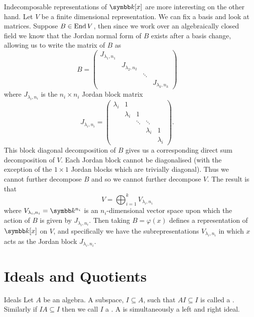 \begin{exm}{}{}
    Indecomposable representations of \(\field[x]\) are more interesting on the other hand.
    Let \(V\) be a finite dimensional representation.
    We can fix a basis and look at matrices.
    Suppose \(B \in \operatorname{End} V\), then since we work over an algebraically closed field we know that the Jordan normal form of \(B\) exists after a basis change, allowing us to write the matrix of \(B\) as
    \begin{equation}
        B = 
        \begin{pmatrix}
            J_{\lambda_1, n_1} \\
            & J_{\lambda_2, n_2} \\
            & & \ddots \\
            & & & J_{\lambda_k, n_k}
        \end{pmatrix}
    \end{equation}
    where \(J_{\lambda_i, n_i}\) is the \(n_i \times n_i\) Jordan block matrix
    \begin{equation}
        J_{\lambda_i, n_i} = 
        \begin{pmatrix}
            \lambda_i & 1 \\
            & \lambda_i & 1\\
            & & \ddots & \ddots\\
            & & & \lambda_i & 1\\
            & & & & \lambda_i
        \end{pmatrix}
        .
    \end{equation}
    This block diagonal decomposition of \(B\) gives us a corresponding direct sum decomposition of \(V\).
    Each Jordan block cannot be diagonalised (with the exception of the \(1 \times 1\) Jordan blocks which are trivially diagonal).
    Thus we cannot further decompose \(B\) and so we cannot further decompose \(V\).
    The result is that
    \begin{equation}
        V = \bigoplus_{i=1}^{k} V_{\lambda_i, n_i}
    \end{equation}
    where \(V_{\lambda_i, n_i} = \field^{n_i}\) is an \(n_i\)-dimensional vector space upon which the action of \(B\) is given by \(J_{\lambda_i, n_i}\).
    Then taking \(B = \varphi(x)\) defines a representation of \(\field[x]\) on \(V\), and specifically we have the subrepresentations \(V_{\lambda_i, n_i}\) in which \(x\) acts as the Jordan block \(J_{\lambda_i, n_i}\).
\end{exm}

\section{Ideals and Quotients}
\begin{dfn}{Ideals}{}
    Let \(A\) be an algebra.
    A subspace, \(I \subseteq A\), such that \(AI \subseteq I\) is called a .
    Similarly if \(IA \subseteq I\) then we call \(I\) a .
    A  is simultaneously a left and right ideal.
\end{dfn}

